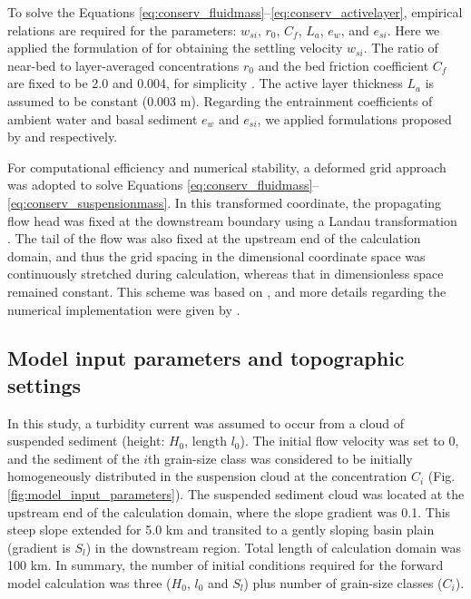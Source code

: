 To solve the Equations \ref{eq:conserv_fluidmass}--\ref{eq:conserv_activelayer}, empirical relations are required for the parameters: $w_{si}$, $r_0$, $C_f$, $L_a$, $e_w$, and $e_{si}$. Here we applied the formulation of \citet{dietrich1982settling} for obtaining the settling velocity $w_{si}$. The ratio of near-bed to layer-averaged concentrations $r_0$ and the bed friction coefficient $C_f$ are fixed to be 2.0 and 0.004, for simplicity \citep{Garcia1990}. The active layer thickness $L_a$ is assumed to be constant (0.003 m). Regarding the entrainment coefficients of ambient water and basal sediment $e_w$ and $e_{si}$, we applied formulations proposed by \citet{parker1987experiments} and \citet{garcia1991entrainment} respectively.

For computational efficiency and numerical stability, a deformed grid approach was adopted to solve Equations \ref{eq:conserv_fluidmass}--\ref{eq:conserv_suspensionmass}. In this transformed coordinate, the propagating flow head was fixed at the downstream boundary using a Landau transformation \citep{Crank1984}. The tail of the flow was also fixed at the upstream end of the calculation domain, and thus the grid spacing in the dimensional coordinate space was continuously stretched during calculation, whereas that in dimensionless space remained constant. This scheme was based on \citet{kostic2006response}, and more details regarding the numerical implementation were given by \citet{Nakao2017}.

\subsection{Model input parameters and topographic settings}
In this study, a turbidity current was assumed to occur from a cloud of suspended sediment (height: $H_0$, length $l_0$). The initial flow velocity was set to 0, and the sediment of the $i$th grain-size class was considered to be initially homogeneously distributed in the suspension cloud at the concentration $C_i$ (Fig. \ref{fig:model_input_parameters}). The suspended sediment cloud was located at the upstream end of the calculation domain, where the slope gradient was 0.1. This steep slope extended for 5.0 km and transited to a gently sloping basin plain (gradient is $S_l$) in the downstream region. Total length of calculation domain was 100 km. In summary, the number of initial conditions required for the forward model calculation was three ($H_0$, $l_0$ and $S_l$) plus number of grain-size classes ($C_i$). 

